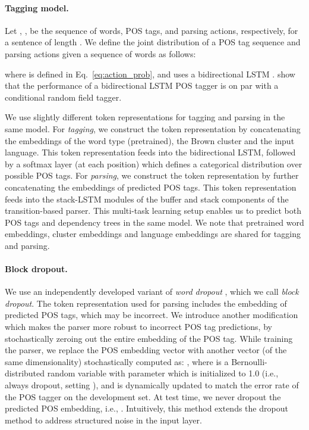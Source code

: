 \documentclass[11pt]{article}
\begin{document}
\paragraph{Tagging model.}
Let , ,  be the sequence of words, POS tags, and parsing actions, respectively, for a sentence of length .
We define the joint distribution of a POS tag sequence and parsing actions given a sequence of words as follows:

where  is defined in Eq.~\ref{eq:action_prob}, and  uses a bidirectional LSTM \cite{graves:13}.
 show that the performance of a bidirectional LSTM POS tagger is on par with a conditional random field tagger.

We use slightly different token representations for tagging and parsing in the same model.
For \textit{tagging}, we construct the token representation by concatenating the embeddings of the word type (pretrained), the Brown cluster and the input language.
This token representation feeds into the bidirectional LSTM, followed by a softmax layer (at each position) which defines a categorical distribution over possible POS tags.
For \textit{parsing}, we construct the token representation by further concatenating the embeddings of predicted POS tags.
This token representation feeds into the stack-LSTM modules of the buffer and stack components of the transition-based parser.
This multi-task learning setup enables us to predict both POS tags and dependency trees in the same model.
We note that pretrained word embeddings, cluster embeddings and language embeddings are shared for tagging and parsing.

\paragraph{Block dropout.}
We use an independently developed variant of \textit{word dropout} \cite{iyyer:15}, which we call \textit{block dropout}.
The token representation used for parsing includes the embedding of predicted POS tags, which may be incorrect.
We introduce another modification which makes the parser more robust to incorrect POS tag predictions, by stochastically zeroing out the entire embedding of the POS tag.
While training the parser, we replace the POS embedding vector  with another vector (of the same dimensionality) stochastically computed as: ,
where  is a Bernoulli-distributed random variable with parameter  which is initialized to 1.0 (i.e., always dropout, setting ), and is dynamically updated to match the error rate of the POS tagger on the development set.
At test time, we never dropout the predicted POS embedding, i.e., .
Intuitively, this method extends the dropout method \cite{srivastava:14} to address structured noise in the input layer.
\end{document}
